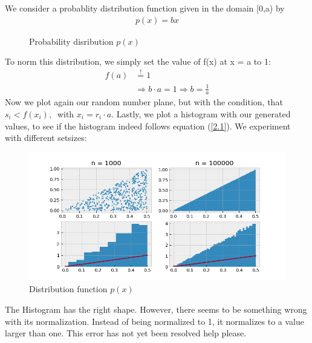\documentclass{article}
\begin{document}
We consider a probablity distribution function given in the domain [0,a) by
\begin{align}
    p(x) = bx \label{2.1}
\end{align}
\begin{figure}[H]
    \centering
    \caption{Probability disribution $p(x)$}
\end{figure}
To norm this distribution, we simply set the value of f(x) at x = a to 1:
\begin{align} \nonumber
    f(a) &\stackrel{!}{=} 1 \\
    &\Rightarrow b \cdot a = 1 \Rightarrow b = \frac{1}{a}
\end{align}
Now we plot again our random number plane, but with the condition, that
\(s_i < f(x_i), \ \) with \( x_i = r_i \cdot a\).
Lastly, we plot a histogram with our generated values, to see if the histogram
indeed follows equation (\ref{2.1}). We experiment with different setsizes:
\begin{figure}[H]
    \centering
    \includegraphics[width=12cm]{Fig2-1.png}
    \caption{Distribution function \( p(x) \)}
\end{figure}
The Histogram has the right shape. However, there seems to be something wrong 
with its normalization. Instead of being normalized to 1, it normalizes to
a value larger than one. \color{red!90!black} This error has not yet been
resolved help please. \color{black}
\end{document}
